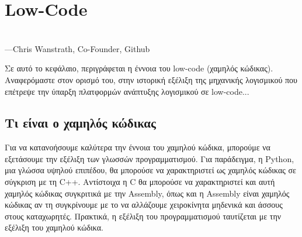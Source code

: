 \chapter{Low-Code}
    \begin{displayquote} \centering
         \\
        \hspace*{\fill}---Chris Wanstrath, Co-Founder, Github
    \end{displayquote}
    \vspace{1em}

    Σε αυτό το κεφάλαιο, περιγράφεται η έννοια του low-code (χαμηλός κώδικας). Αναφερόμαστε στον ορισμό του, στην ιστορική εξέλιξη της μηχανικής λογισμικού που επέτρεψε την ύπαρξη πλατφορμών ανάπτυξης λογισμικού σε low-code...

    \section{Τι είναι ο χαμηλός κώδικας}
        \begin{displayquote} \justifying
             \cite{Ibm_2024}
        \end{displayquote}

        Για να κατανοήσουμε καλύτερα την έννοια του χαμηλού κώδικα, μπορούμε να εξετάσουμε την εξέλιξη των γλωσσών προγραμματισμού. Για παράδειγμα, η Python, μια γλώσσα υψηλού επιπέδου, θα μπορούσε να χαρακτηριστεί ως χαμηλός κώδικας σε σύγκριση με τη C++. Αντίστοιχα η C θα μπορούσε να χαρακτηριστεί και αυτή χαμηλός κώδικας συγκριτικά με την Assembly, όπως και η Assembly είναι χαμηλός κώδικας αν τη συγκρίνουμε με το να αλλάζουμε χειροκίνητα μηδενικά και άσσους στους καταχωρητές. Πρακτικά, η εξέλιξη του προγραμματισμού ταυτίζεται με την εξέλιξη του χαμηλού κώδικα.

